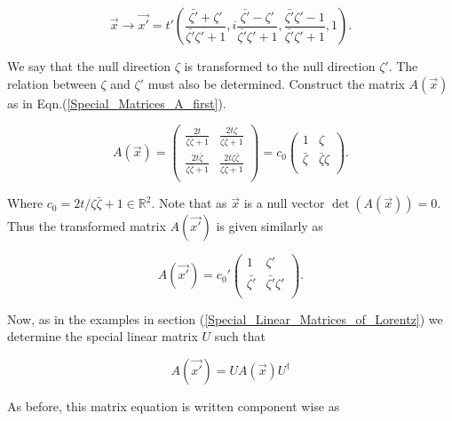 \begin{equation*}
\vec{x} \rightarrow \vec{x'} = t'\left( \frac{\bar{\zeta'} + \zeta'}{\bar{\zeta'}\zeta' + 1}  ,i\frac{\bar{\zeta'} - \zeta'}{\bar{\zeta'}\zeta' + 1}, \frac{\bar{\zeta'}\zeta' - 1}{\bar{\zeta'}\zeta' + 1},1  \right).
\end{equation*}

\noindent We say that the null direction $\zeta$ is transformed to the null direction $\zeta'$. The relation between $\zeta$ and $\zeta'$ must also be determined. Construct the matrix $A(\vec{x})$ as in Eqn.(\ref{Special_Matrices_A_first}). 

\begin{equation*}
A(\vec{x}) = 
\left(
\begin{array}{cc}
\frac{2t}{\zeta\bar{\zeta}+1} & \frac{2t\zeta}{\zeta\bar{\zeta}+1} \\
\frac{2t\bar{\zeta}}{\zeta\bar{\zeta}+1} & \frac{2t\zeta\bar{\zeta}}{\zeta\bar{\zeta}+1} \\
\end{array}
\right)
=
c_0\left(
\begin{array}{cc}
1           & \zeta \\ 
\bar{\zeta} & \bar{\zeta}\zeta \\ 
\end{array}
\right).
\end{equation*}

\noindent Where $c_0 = 2t/\zeta\bar{\zeta}+1 \in \mathbb{R}^2$. Note that as $\vec{x}$ is a null vector $\det{(A(\vec{x}))} = 0$. Thus the transformed matrix $A(\vec{x'})$ is given similarly as

\begin{equation*}
A(\vec{x'}) = 
{c_0}'\left(
\begin{array}{cc}
1           & \zeta' \\ 
\bar{\zeta'} & \bar{\zeta'}\zeta' \\ 
\end{array}
\right).
\end{equation*}

\noindent Now, as in the examples in section (\ref{Special_Linear_Matrices_of_Lorentz}) we determine the special linear matrix $U$ such that

\begin{equation}\label{Ext_Complex_UAU}
A(\vec{x'}) = U A(\vec{x}) U^{\dagger}
\end{equation}

\noindent As before, this matrix equation is written component wise as

